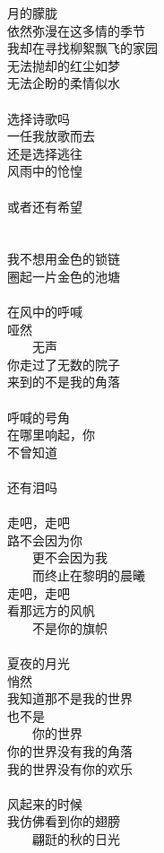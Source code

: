 月的朦胧\\
依然弥漫在这多情的季节\\
我却在寻找柳絮飘飞的家园\\
无法抛却的红尘如梦\\
无法企盼的柔情似水\\
\\
选择诗歌吗\\
一任我放歌而去\\
还是选择逃往\\
风雨中的怆惶\\
\\
或者还有希望\\
\\
\\
我不想用金色的锁链\\
圈起一片金色的池塘\\
\\
在风中的呼喊\\
哑然\\
　　无声\\
你走过了无数的院子\\
来到的不是我的角落\\
\\
呼喊的号角\\
在哪里响起，你\\
不曾知道\\
\\
还有泪吗\\
\\
走吧，走吧\\
路不会因为你\\
　　更不会因为我\\
　　而终止在黎明的晨曦\\
走吧，走吧\\
看那远方的风帆\\
　　不是你的旗帜\\
\\
夏夜的月光\\
悄然\\
我知道那不是我的世界\\
也不是\\
　　你的世界\\
你的世界没有我的角落\\
我的世界没有你的欢乐\\
\\
风起来的时候\\
我仿佛看到你的翅膀\\
　　翩跹的秋的日光\\
